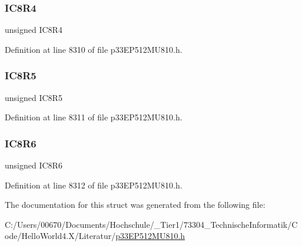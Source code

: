 \subsubsection{\texorpdfstring{I\+C8\+R4}{IC8R4}}
{\footnotesize\ttfamily unsigned I\+C8\+R4}



Definition at line 8310 of file p33\+E\+P512\+M\+U810.\+h.

\mbox{\label{structtag_r_p_i_n_r10_b_i_t_s_ab7b2f8546060699d054e431b5ba88b98}} 
\subsubsection{\texorpdfstring{I\+C8\+R5}{IC8R5}}
{\footnotesize\ttfamily unsigned I\+C8\+R5}



Definition at line 8311 of file p33\+E\+P512\+M\+U810.\+h.

\mbox{\label{structtag_r_p_i_n_r10_b_i_t_s_abe369cb288ac08b2fba0dd34371efc3e}} 
\subsubsection{\texorpdfstring{I\+C8\+R6}{IC8R6}}
{\footnotesize\ttfamily unsigned I\+C8\+R6}



Definition at line 8312 of file p33\+E\+P512\+M\+U810.\+h.



The documentation for this struct was generated from the following file\+:\begin{DoxyCompactItemize}
\item 
C\+:/\+Users/00670/\+Documents/\+Hochschule/\+\_\+\+Tier1/73304\+\_\+\+Technische\+Informatik/\+Code/\+Hello\+World4.\+X/\+Literatur/\hyperlink{p33_e_p512_m_u810_8h}{p33\+E\+P512\+M\+U810.\+h}\end{DoxyCompactItemize}
